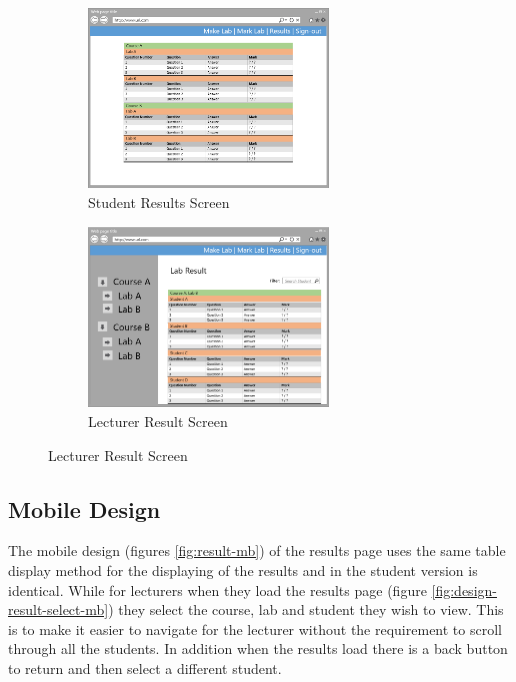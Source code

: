 \documentclass[11pt]{report}
\begin{document}
\begin{figure}[H]
\caption{Results Page: Desktop Designs}
\label{fig:result-pc}
\centering
\begin{subfigure}[c]{0.47\textwidth}
    \centering
    \includegraphics[width=0.70\textwidth]{images/design/result-student-desktop.png}
    \caption{Student Results Screen}
    \label{fig:design-result-student-pc}
\end{subfigure}
\hfill
\begin{subfigure}[c]{0.45\textwidth}
    \centering
    \includegraphics[width=0.7\textwidth]{images/design/result-lecturer-desktop.png}
    \caption{Lecturer Result Screen}
    \label{fig:design-result-lecturer-pc}
\end{subfigure}
\end{figure}

\subsection*{Mobile Design}

\noindent The mobile design (figures \ref{fig:result-mb}) of the results page uses the same table display method for the displaying of the results and in the student version is identical. While for lecturers when they load the results page (figure \ref{fig:design-result-select-mb}) they select the course, lab and student they wish to view. This is to make it easier to navigate for the lecturer without the requirement to scroll through all the students. In addition when the results load there is a back button to return and then select a different student.
\end{document}
